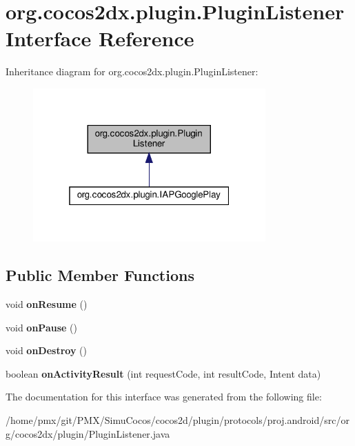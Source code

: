 \hypertarget{interfaceorg_1_1cocos2dx_1_1plugin_1_1PluginListener}{}\section{org.\+cocos2dx.\+plugin.\+Plugin\+Listener Interface Reference}
\label{interfaceorg_1_1cocos2dx_1_1plugin_1_1PluginListener}


Inheritance diagram for org.\+cocos2dx.\+plugin.\+Plugin\+Listener\+:
\nopagebreak
\begin{figure}[H]
\begin{center}
\leavevmode
\includegraphics[width=253pt]{interfaceorg_1_1cocos2dx_1_1plugin_1_1PluginListener__inherit__graph}
\end{center}
\end{figure}
\subsection*{Public Member Functions}
\begin{DoxyCompactItemize}
\item 
\mbox{\label{interfaceorg_1_1cocos2dx_1_1plugin_1_1PluginListener_a137ae33f3a887af2b93c28eea3d0408a}} 
void {\bfseries on\+Resume} ()
\item 
\mbox{\label{interfaceorg_1_1cocos2dx_1_1plugin_1_1PluginListener_a051a02456fe3c9cdae6e6cf805d9f6fe}} 
void {\bfseries on\+Pause} ()
\item 
\mbox{\label{interfaceorg_1_1cocos2dx_1_1plugin_1_1PluginListener_a358cbd1dbaf98ee75ad34461b25d42b9}} 
void {\bfseries on\+Destroy} ()
\item 
\mbox{\label{interfaceorg_1_1cocos2dx_1_1plugin_1_1PluginListener_ac628c7de61a0179253303f75640696eb}} 
boolean {\bfseries on\+Activity\+Result} (int request\+Code, int result\+Code, Intent data)
\end{DoxyCompactItemize}


The documentation for this interface was generated from the following file\+:\begin{DoxyCompactItemize}
\item 
/home/pmx/git/\+P\+M\+X/\+Simu\+Cocos/cocos2d/plugin/protocols/proj.\+android/src/org/cocos2dx/plugin/Plugin\+Listener.\+java\end{DoxyCompactItemize}
